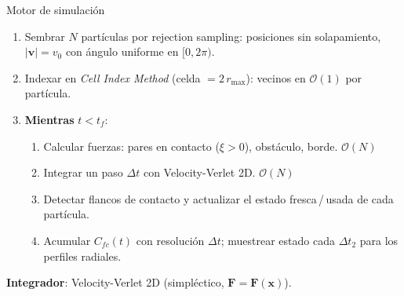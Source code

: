 \documentclass[10pt,aspectratio=169]{beamer}
\newcommand{\vect}[1]{\mathbf{#1}}
\begin{document}
\begin{frame}{Motor de simulación}
    \begin{enumerate}\setlength\itemsep{3pt}
        \item Sembrar $N$ partículas por rejection sampling: posiciones sin
              solapamiento, $|\vect{v}| = v_0$ con ángulo uniforme en $[0, 2\pi)$.
        \item Indexar en \emph{Cell Index Method} (celda $= 2\,r_{\max}$):
              vecinos en $\mathcal{O}(1)$ por partícula.
        \item \textbf{Mientras} $t < t_f$:
        \begin{enumerate}\setlength\itemsep{1pt}
            \item Calcular fuerzas: pares en contacto ($\xi>0$),
                  obstáculo, borde. \hfill $\mathcal{O}(N)$
            \item Integrar un paso $\Delta t$ con Velocity-Verlet 2D.
                  \hfill $\mathcal{O}(N)$
            \item Detectar flancos de contacto y actualizar el estado
                  fresca\,/\,usada de cada partícula.
            \item Acumular $C_{fc}(t)$ con resolución $\Delta t$;
                  muestrear estado cada $\Delta t_2$ para los perfiles
                  radiales.
        \end{enumerate}
    \end{enumerate}
    \vspace{0.2cm}
    \textbf{Integrador}: Velocity-Verlet 2D (simpléctico, $\vect{F} = \vect{F}(\vect{x})$).
\end{frame}
\end{document}
